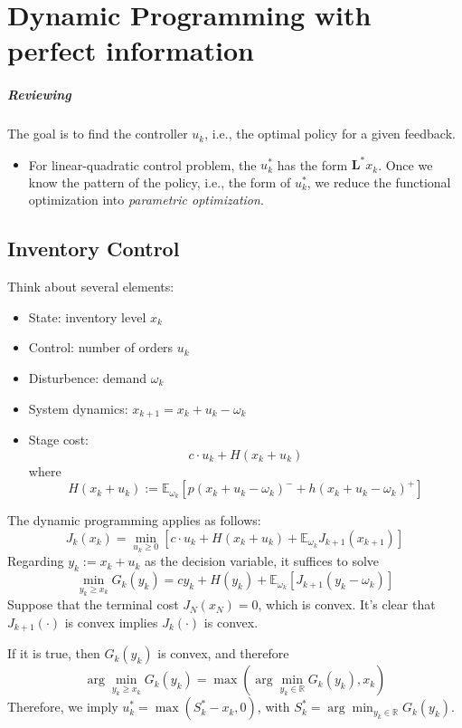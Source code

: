 \chapter{Dynamic Programming with perfect information}

\paragraph{Reviewing}

The goal is to find the controller $u_k$, i.e., the optimal policy for a given feedback.
\begin{itemize}
\item
For linear-quadratic control problem, the $u_k^*$ has the form $\bm L^*x_k$. Once we know the pattern of the policy, i.e., the form of $u_k^*$,
we reduce the functional optimization into \emph{parametric optimization}.
\end{itemize}

\section{Inventory Control}
Think about several elements:
\begin{itemize}
\item
State: inventory level $x_k$
\item
Control: number of orders $u_k$
\item
Disturbence: demand $\omega_k$
\item
System dynamics: $x_{k+1} = x_k + u_k -\omega_k$
\item
Stage cost:
\[
c\cdot u_k + H(x_k + u_k)
\]
where 
\[
H(x_k + u_k):=
\mathbb{E}_{\omega_k}
\left[
p(x_k+u_k-\omega_k)^- 
+
h(x_k+u_k-\omega_k)^+
\right]
\]
\end{itemize}

The dynamic programming applies as follows:
\[
J_k(x_k)
=
\min_{u_k\ge0}
\left[
c\cdot u_k
+
H(x_k+u_k)
+
\mathbb{E}_{\omega_k}
J_{k+1}(x_{k+1})
\right]
\]
Regarding $y_k:=x_k+u_k$ as the decision variable, it suffices to solve
\[
\min_{y_k\ge x_k}
G_k(y_k)
=cy_k+H(y_k)+\mathbb{E}_{\omega_k}\left[J_{k+1}(y_k-\omega_k)\right]
\]
Suppose that the terminal cost $J_N(x_N)=0$, which is convex. It's clear that
$J_{k+1}(\cdot)$ is convex implies $J_k(\cdot)$ is convex.

If it is true, then $G_k(y_k)$ is convex, and therefore
\[
\arg\min_{y_k\ge x_k} G_k(y_k)
=
\max\left(
\arg\min_{y_k\in\mathbb{R}}G_k(y_k),
x_k
\right)
\]
Therefore, we imply $u_k^* = \max(S_k^*-x_k,0)$, with $S_k^* = \arg\min_{y_k\in\mathbb{R}}G_k(y_k)$.

